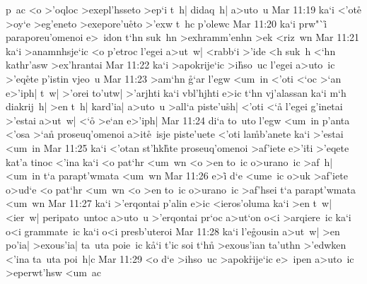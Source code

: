 p~ac
<o
>'oqloc
>exepl'hsseto
>ep`i
t~h|
didaq~h|
a>uto~u\bibvsend
\vs Mar 11:19
ka`i
<'ot\r{e}
>oy`e
>eg'eneto
>exepore'u\r{e}to
>'exw
t~hc
p'olewc\bibvsend
\vs Mar 11:20
ka`i
prw"`i\r{}
paraporeu'omenoi
e>~idon
t`hn
suk~hn
>exhramm'enhn
>ek
<riz~wn\bibvsend
\vs Mar 11:21
ka`i
>anamnhsje`ic
<o
p'etroc
l'egei
a>ut~w|
<rabb`i
>'ide
<h
suk~h
<`hn
kathr'asw
>ex'hrantai\bibvsend
\vs Mar 11:22
ka`i
>apokrije`ic
>i\r{h}so~uc
l'egei
a>uto~ic
>'eq\r{e}te
p'istin
vjeo~u\bibvsend
\vs Mar 11:23
>am`hn
\r{g}`ar
l'egw
<um~in
<'oti
<`oc
>`an
e>'iph|
t~w|
>'orei
to'utw|
>'arjhti
ka`i
vbl'hjhti
e>ic
t`hn
vj'alassan
ka`i
m`h
diakrij~h|
>en
t~h|
kard'ia|
a>uto~u
>all`a
piste'u\r{s}h|
<'oti
<`a\r{}
l'egei
g'inetai
>'estai
a>ut~w|
<`o\r{}
>e`an
e>'iph|\bibvsend
\vs Mar 11:24
di`a
to~uto
l'egw
<um~in
p'anta
<'osa
>`an\r{}
proseuq'omenoi
a>it\r{e}~isje
piste'uete
<'oti
la\r{m}b'anete
ka`i
>'estai
<um~in\bibvsend
\vs Mar 11:25
ka`i
<'otan
st'hk\r{h}te
proseuq'omenoi
>af'iete
e>'i\r{t}i
>'eqete
kat'a
tinoc
<'ina
ka`i
<o
pat`hr
<um~wn
<o
>en
to~ic
o>urano~ic
>af~h|
<um~in
t`a
parapt'wmata
<um~wn\bibvsend
\vs Mar 11:26
e>i\r{}
d`e
<ume~ic
o>uk
>af'iete
o>ud`e
<o
pat`hr
<um~wn
<o
>en
to~ic
o>urano~ic
>af'hsei
t`a
parapt'wmata
<um~wn\bibvsend
\vs Mar 11:27
ka`i
>'erqontai
p'alin
e>ic
<ieros'oluma
ka`i
>en
t~w|
<ier~w|
peripato~untoc
a>uto~u
>'erqontai
pr`oc
a>ut`on
o<i
>arqiere~ic
ka`i
o<i
grammate~ic
ka`i
o<i
presb'uteroi\bibvsend
\vs Mar 11:28
ka`i
l'e\r{g}ousin
a>ut~w|
>en
po'ia|
>exous'ia|
ta~uta
poie~ic
k\r{a}`i
t'ic
soi
t`hn\r{}
>exous'ian
ta'uthn
>'edwken
<'ina
ta~uta
poi~h|c\bibvsend
\vs Mar 11:29
<o
d`e
>ihso~uc
>apok\r{r}ije`ic
e>~ipen
a>uto~ic
>eperwt'hsw
<um~ac
